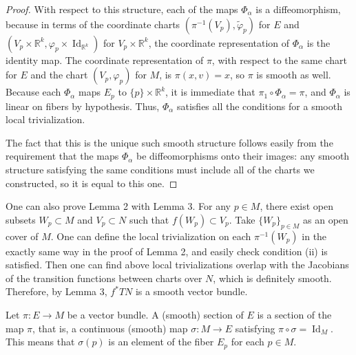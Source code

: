 \documentclass{ctexart}
\begin{document}
\begin{proof}[Proof]
  With respect to this structure, each of the maps $\Phi_\alpha$ is a diffeomorphism, 
  because in terms of the coordinate charts $\left(\pi^{-1}\left(V_p\right), \tilde{\varphi}_p\right)$ for $E$ and $\left(V_p \times \mathbb{R}^k, \varphi_p \times \operatorname{Id}_{\mathbb{R}^k}\right)$ 
  for $V_p \times \mathbb{R}^k$, the coordinate representation of $\Phi_\alpha$ is the identity map. The coordinate representation of $\pi$, 
  with respect to the same chart for $E$ and the chart $\left(V_p, \varphi_p\right)$ for $M$, is $\pi(x, v)=x$, so $\pi$ is smooth as well. 
  Because each $\Phi_\alpha$ maps $E_p$ to $\{p\} \times \mathbb{R}^k$, it is immediate that $\pi_1 \circ \Phi_\alpha=\pi$, 
  and $\Phi_\alpha$ is linear on fibers by hypothesis. Thus, $\Phi_\alpha$ satisfies all the conditions for a smooth local trivialization.

  The fact that this is the unique such smooth structure follows easily from the requirement that the maps $\Phi_\alpha$ be diffeomorphisms onto their images: 
  any smooth structure satisfying the same conditions must include all of the charts we constructed, so it is equal to this one.
\end{proof}

One can also prove Lemma 2 with Lemma 3. For any $p\in M$, there exist open subsets $W_p\subset M$ and $V_p\subset N$ such that $f(W_p)\subset V_p$. Take $\{W_p\}_{p\in M}$
as an open cover of $M$. One can define the local trivialization on each $\pi^{-1}(W_p)$ in the exactly same way in the proof of Lemma 2, and easily check 
condition (ii) is satisfied. Then one can find above local trivializations overlap with the Jacobians of the transition functions between charts over $N$, 
which is definitely smooth. Therefore, by Lemma 3, $f^*TN$ is a smooth vector bundle.

Let $\pi: E \rightarrow M$ be a vector bundle. A (smooth) section of $E$ is a section of the map $\pi$, that is, 
a continuous (smooth) map $\sigma: M \rightarrow E$ satisfying $\pi \circ \sigma=\operatorname{Id}_M$. 
This means that $\sigma(p)$ is an element of the fiber $E_p$ for each $p \in M$. 
\end{document}
